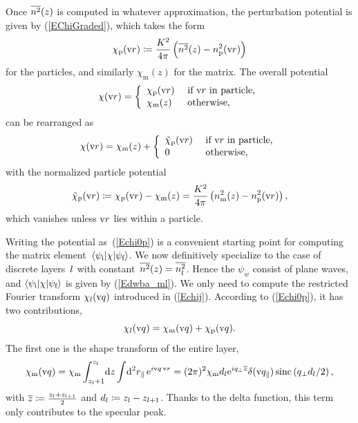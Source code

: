 Once $\overline{n^2}(z)$ is computed in whatever approximation,
the perturbation potential is given by (\ref{EChiGraded}),
which takes the form
\begin{equation}
  \chi_\text{p}(\text{v}{r}) \coloneqq  \frac{K^2}{4\pi}\left(\overline{n^2}(z)-n_\text{p}^2(\text{v}{r})\right)
\end{equation}
for the particles, and similarly $\chi_\text{m}(z)$ for the matrix.
The overall potential
\begin{equation}
  \chi(\text{v}{r})=\left\{\begin{array}{ll}
  \chi_\text{p}(\text{v}{r})&\text{~if $\text{v}{r}$ in particle,}\\[.2ex]
  \chi_\text{m}(z) &\text{~otherwise,} \end{array}\right.
\end{equation}
%
%
can be rearranged as
\begin{equation}\label{Echi0p}
  \chi(\text{v}{r})=\chi_\text{m}(z) + \left\{\begin{array}{ll}
  \tilde\chi_\text{p}(\text{v}{r})&\text{~if $\text{v}{r}$ in particle,}\\[.2ex]
  0 &\text{~otherwise,} \end{array}\right.
\end{equation}
with the normalized particle potential
\begin{equation}
  \tilde\chi_\text{p}(\text{v}{r})
  \coloneqq  \chi_\text{p}(\text{v}{r})-\chi_\text{m}(z)
  = \frac{K^2}{4\pi}\left(n_\text{m}^2(z)-n_\text{p}^2(\text{v}{r})\right),
\end{equation}
%
which vanishes unless $\text{v}{r}$ lies within a particle.

Writing the potential as~(\ref{Echi0p}) is a convenient starting point
for computing the matrix element~$\left\langle\psi_{\text{i}}|\chi|\psi_{\text{f}}\right\rangle$.
We now definitively specialize to the case of discrete layers~$l$
with constant~$\overline{n^2}(z)=\overline{n_l^2}$.
Hence the $\psi_{w}$ consist of plane waves,
and $\left\langle\psi_{\text{i}}|\chi|\psi_{\text{f}}\right\rangle$ is given by (\ref{Edwba_ml}).
We only need to compute the restricted Fourier transform
$\chi_l(\text{v}{q})$ introduced in (\ref{Echij}).
According to (\ref{Echi0p}),
it has two contributions,
\begin{equation}\label{Echijmp}
  \chi_l(\text{v}{q}) = \chi_\text{m}(\text{v}{q}) + \chi_\text{p}(\text{v}{q}).
\end{equation}
The first one is the shape transform of the entire layer,
\begin{equation}
  \chi_\text{m}(\text{v}{q})
  = \chi_\text{m} \int_{z_l+1}^{z_{l}}\!\text{d} z \int\!\text{d}^2r_\parallel\, \text{e}^{i\text{v}{q}\,\text{v}{r}}
  = (2\pi)^2 \chi_\text{m} d_l \text{e}^{i q_\perp \overline{z}}  \delta(\text{v}{q}_\parallel) \operatorname{sinc}\left( q_\perp d_l /2 \right),
\end{equation}
with $\overline{z} \coloneqq \frac{z_l + z_{l+1}}{2}$ and $d_l \coloneqq z_l - z_{l+1}$.
Thanks to the delta function,
this term only contributes to the specular peak.

